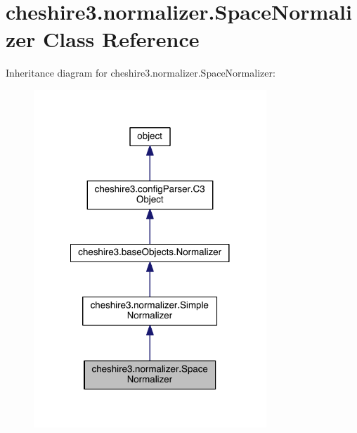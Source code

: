 \hypertarget{classcheshire3_1_1normalizer_1_1_space_normalizer}{\section{cheshire3.\-normalizer.\-Space\-Normalizer Class Reference}
\label{classcheshire3_1_1normalizer_1_1_space_normalizer}
}


Inheritance diagram for cheshire3.\-normalizer.\-Space\-Normalizer\-:
\nopagebreak
\begin{figure}[H]
\begin{center}
\leavevmode
\includegraphics[width=248pt]{classcheshire3_1_1normalizer_1_1_space_normalizer__inherit__graph}
\end{center}
\end{figure}


